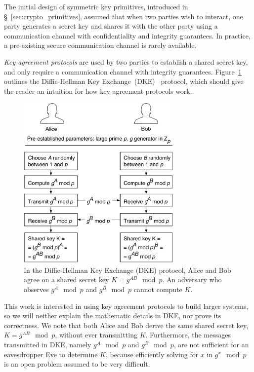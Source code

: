 \label{sec:key_agreement}

The initial design of symmetric key primitives, introduced in
\S~\ref{sec:crypto_primitives}, assumed that when two parties wish to interact,
one party generates a secret key and shares it with the other party using a
communication channel with confidentiality and integrity guarantees. In
practice, a pre-existing secure communication channel is rarely available.

\textit{Key agreement protocols} are used by two parties to establish a shared
secret key, and only require a communication channel with integrity guarantees.
Figure~\ref{fig:dh_key_exchange} outlines the Diffie-Hellman Key
Exchange~(DKE)~\cite{diffie1976keyexchange} protocol, which should give the
reader an intuition for how key agreement protocols work.

\begin{figure}[hbt]
  \centering
  \includegraphics[width=80mm]{figures/dh_key_exchange.pdf}
  \caption{
    In the Diffie-Hellman Key Exchange (DKE) protocol, Alice and Bob agree on a
    shared secret key $K = g^{AB} \mod p$. An adversary who observes
    $g^{A} \mod p$ and $g^{B} \mod p$ cannot compute $K$.
  }
  \label{fig:dh_key_exchange}
\end{figure}

This work is interested in using key agreement protocols to build larger
systems, so we will neither explain the mathematic details in DKE, nor prove
its correctness. We note that both Alice and Bob derive the same shared secret
key, $K = g^{AB} \mod p$, without ever transmitting $K$. Furthermore, the
messages transmitted in DKE, namely $g^{A} \mod p$ and $g^{B} \mod p$, are not
sufficient for an eavesdropper Eve to determine $K$, because efficiently
solving for $x$ in $g^{x} \mod p$ is an open problem assumed to be very
difficult.

